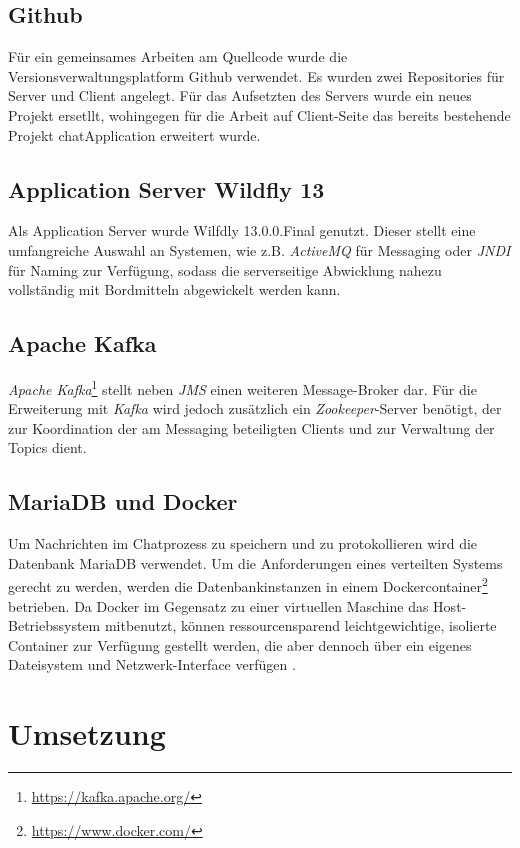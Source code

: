 \documentclass[10pt,journal,compsoc]{IEEEtran}
\begin{document}
\subsection{Github}
Für ein gemeinsames Arbeiten am Quellcode wurde die Versionsverwaltungsplatform Github verwendet. Es wurden zwei Repositories für Server und Client angelegt. Für das Aufsetzten des Servers wurde ein neues Projekt ersetllt, wohingegen für die Arbeit auf Client-Seite das bereits bestehende Projekt chatApplication erweitert wurde.

\subsection{Application Server Wildfly 13}

Als Application Server wurde Wilfdly 13.0.0.Final genutzt. Dieser stellt eine umfangreiche Auswahl an Systemen, wie z.B. \textit{ActiveMQ} für Messaging oder \textit{JNDI} für Naming zur Verfügung, sodass die serverseitige Abwicklung nahezu vollständig mit Bordmitteln abgewickelt werden kann.

\subsection{Apache Kafka}
\textit{Apache Kafka}\footnote{\url{https://kafka.apache.org/}} stellt neben \textit{JMS} einen weiteren Message-Broker dar.
Für die Erweiterung mit \textit{Kafka} wird jedoch zusätzlich ein \textit{Zookeeper}-Server benötigt, der zur Koordination der am Messaging beteiligten Clients und zur Verwaltung der Topics dient.

\subsection{MariaDB und Docker}
Um Nachrichten im Chatprozess zu speichern und zu protokollieren wird die Datenbank MariaDB verwendet. Um die Anforderungen eines verteilten Systems gerecht zu werden, werden die Datenbankinstanzen in einem Dockercontainer\footnote{\url{https://www.docker.com/}} betrieben. Da Docker im Gegensatz zu einer virtuellen Maschine das Host-Betriebssystem mitbenutzt, können ressourcensparend leichtgewichtige, isolierte Container zur Verfügung gestellt werden, die aber dennoch über ein eigenes Dateisystem und Netzwerk-Interface verfügen \cite{Docker:Functionality}.



\section{Umsetzung}
\end{document}
